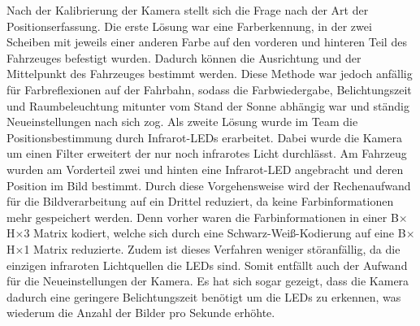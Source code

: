 Nach der Kalibrierung der Kamera stellt sich die Frage nach der Art der Positionserfassung. Die erste Lösung war eine Farberkennung, in der zwei Scheiben mit jeweils einer anderen Farbe auf den vorderen und hinteren Teil des Fahrzeuges befestigt wurden. Dadurch können die Ausrichtung und der Mittelpunkt des Fahrzeuges bestimmt werden. Diese Methode war jedoch anfällig für Farbreflexionen auf der Fahrbahn, sodass die Farbwiedergabe, Belichtungszeit und Raumbeleuchtung mitunter vom Stand der Sonne abhängig war und ständig Neueinstellungen nach sich zog. Als zweite Lösung wurde im Team die Positionsbestimmung durch Infrarot-LEDs erarbeitet. Dabei wurde die Kamera um einen Filter erweitert der nur noch infrarotes Licht durchlässt. Am Fahrzeug wurden am Vorderteil zwei und hinten eine Infrarot-LED angebracht und deren Position im Bild bestimmt. Durch diese Vorgehensweise wird der Rechenaufwand für die Bildverarbeitung auf ein Drittel reduziert, da keine Farbinformationen mehr gespeichert werden. Denn vorher waren die Farbinformationen in einer B$\times$H$\times$3 Matrix kodiert, welche sich durch eine Schwarz-Weiß-Kodierung auf eine B$\times$H$\times$1 Matrix reduzierte. Zudem ist dieses Verfahren weniger störanfällig, da die einzigen infraroten Lichtquellen die LEDs sind. Somit entfällt auch der Aufwand für die Neueinstellungen der Kamera. Es hat sich sogar gezeigt, dass die Kamera dadurch eine geringere Belichtungszeit benötigt um die LEDs zu erkennen, was wiederum die Anzahl der Bilder pro Sekunde erhöhte.   
